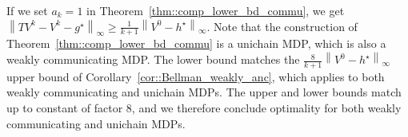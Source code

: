 \documentclass{article} %
\newcommand{\abs}[1]{\left|{#1}\right|}
\newcommand*{\para}[1]{\left({#1}\right)}
\newcommand*{\infn}[1]{\left\|{#1}\right\|_{\infty}}
\begin{document}

If we set $a_k=1$ in Theorem~\ref{thm::comp_lower_bd_commu}, we get $\infn{TV^k-V^k-g^{\star}} \ge \frac{1}{k+1}\infn{V^0-h^{\star}}$. Note that the construction of Theorem~\ref{thm::comp_lower_bd_commu} is a unichain MDP, which is also a weakly communicating MDP. The lower bound matches the $\frac{8}{k+1}\infn{V^0-h^{\star}}$ upper bound of Corollary~\ref{cor::Bellman_weakly_anc}, which applies to both weakly communicating and unichain MDPs. The upper and lower bounds match up to constant of factor $8$, and we therefore conclude optimality for both weakly communicating and unichain MDPs.











\end{document}
